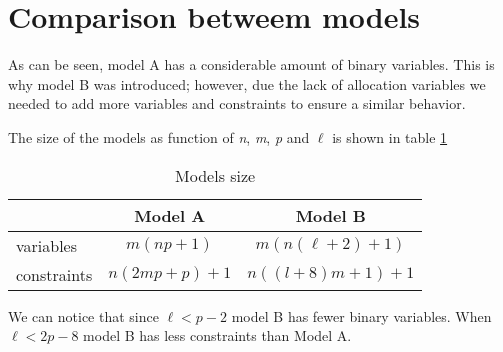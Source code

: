 \section{Comparison betweem models}
As can be seen,
model A
has a considerable amount of binary variables.
This is why model B was introduced;
however, due the lack of allocation variables
we needed to add more variables and constraints
to ensure a similar behavior.

The size of the models
as function of \textit{n}, \textit{m}, \textit{p} and $\ell$
is shown in table \ref{tab:modsize}

\begin{table}[h]
  \label{tab:modsize}
  \centering
  \begin{tabular}{c|c|c|}
    \cline{2-3}
    & Model A & Model B \\ \hline
    \multicolumn{1}{|l|}{variables} &
    $m(np+1)$ &
    $m(n(\ell+2)+1)$ \\ \hline
    \multicolumn{1}{|l|}{constraints} &
    $n(2mp+p)+1$ &
    $n((l+8)m+1)+1$ \\ \hline
  \end{tabular}
  \caption{Models size}
\end{table}

We can notice that
since $\ell < p - 2$
model B has fewer binary variables.
When $\ell < 2p - 8$
model B has
less constraints than Model A.
